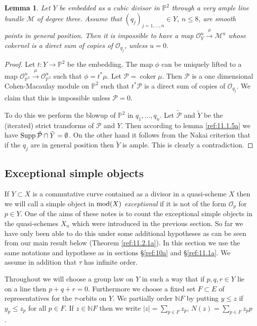 \documentclass{amsproc}
\def \PP{{\mathbb P}}
\def \NN{{\mathbb N}}
\def\Mscr{{\mathcal M}}
\def\Oscr{{\mathcal O}}
\def\Pscr{{\mathcal P}}
\def\mod{\mathop{\text{mod}}}
\def\Supp{\mathop{\text{Supp}}}
\def\coker{\operatorname {coker}}
\def\r{\rightarrow}
\let\oldtext\text
\def\text#1{\oldtext{\upshape #1}}
\newtheorem{lemmas}{Lemma}[subsection]
\theoremstyle{definition}
\theoremstyle{remark}
\numberwithin{equation}{section}
\numberwithin{table}{section}
\numberwithin{figure}{section}
\def\Supp{\mathop{\text{Supp}}}
\begin{document}
\begin{lemmas} 
\label{ref:11.1.6a}
Let $Y$ be embedded as a cubic divisor in $\PP^2$
  through a very ample line bundle $\Mscr$ of degree three. Assume that
  $(q_{j})_{{j}=1,\ldots,n}\in Y$, $n\le 8$,
  are smooth points in general position. Then it is impossible to have a
  map $\Oscr_Y^u\xrightarrow{\phi} \Mscr^u$ whose cokernel is a direct
  sum of copies of $\Oscr_{q_{j}}$, unless $u=0$.
\end{lemmas}
\begin{proof}
Let $t:Y\r \PP^2$ be the embedding. The map $\phi$ can be uniquely
lifted to a map $\Oscr_{\PP^2}^u\xrightarrow{\mu} \Oscr_{\PP^2}^u$
such that $\phi=t^\ast \mu$. Let $\Pscr=\coker  \mu$. Then $\Pscr$ is
a  one dimensional Cohen-Macaulay module on $\PP^2$ such that
$t^\ast\Pscr$ is a direct sum of copies of $\Oscr_{q_{j}}$. We claim that this is
impossible unless $\Pscr=0$. 

To do this we perform the blowup of $\PP^2$ in $q_1,\ldots,q_n$. Let
$\tilde{\Pscr}$ and $\tilde{Y}$ be the (iterated) strict transforms of
$\Pscr$ and $Y$. Then according to lemma \ref{ref:11.1.5a} we have $\Supp
\tilde{\Pscr}\cap \tilde{Y}=\emptyset$. On the other hand it follows
from the Nakai criterion that if the $q_{j}$ are in general position
then $\tilde{Y}$ is ample. This is clearly a
contradiction.
\end{proof}

\subsection{Exceptional simple objects}
If $Y\subset X$ is a commutative curve contained as a divisor in a
quasi-scheme $X$ then we will call a simple object in $\mod(X)$
\emph{exceptional} if it is not of the form $\Oscr_p$ for $p\in Y$.
One of the aims of these notes is to count the exceptional simple
objects in the quasi-schemes $X_n$ which were introduced in the
previous section. So far we have only been able to do this under some
additional hypotheses as can be seen from our main result below
(Theorem \ref{ref:11.2.1a}). In this section we use the same notations
and hypothese as
in sections \S\ref{ref:10a} and
\S\ref{ref:11.1a}. We assume in addition that $\tau$ has
infinite order.

Throughout we will choose a group law on $Y$ in such a way that if
$p,q,r\in Y$ lie on a line then $p+q+r=0$. Furthermore we choose
a fixed set $F\subset E$ of representatives for the $\tau$-orbits on
$Y$. We partially order $\NN F$ by putting $y\le z$ if $y_p\le z_p$
for all $p\in F$. If $z\in\NN F$ then we write $|z|=\sum_{p\in F} z_p$,
$N(z)=\sum_{p\in F} z_p p$.
\end{document}
